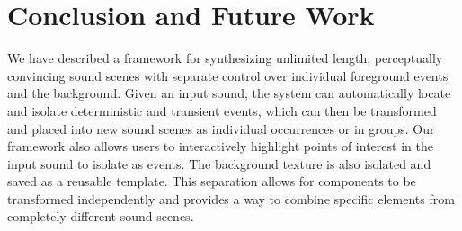 \documentclass[review]{acmsiggraph}      %
\begin{document}





\section{Conclusion and Future Work}

We have described a framework for synthesizing unlimited length, perceptually convincing 
sound scenes with separate control over individual foreground events and the background.  
Given an input sound, the system can automatically locate and isolate deterministic 
and transient events, which can then be transformed and placed into new sound scenes 
as individual occurrences or in groups.  Our framework 
also allows users to interactively highlight points of interest in the input 
sound to isolate as 
events.  The background texture is also isolated and saved as a reusable template. This 
separation allows for components to be transformed independently and provides a way to 
combine specific elements from completely different sound scenes.
\end{document}
